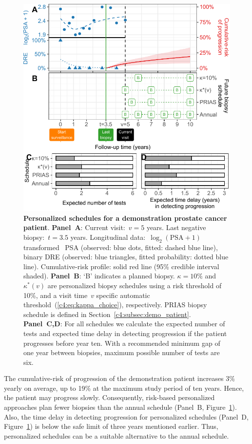 \begin{figure}
\centerline{\includegraphics{contents/c4/images/c4_fig5.pdf}}
\caption{\textbf{Personalized schedules for a demonstration prostate cancer patient}. \textbf{Panel~A}: Current visit:~$v=5$ years. Last negative biopsy:~$t=3.5$ years. Longitudinal data:~$\log_2(\mbox{PSA} + 1)$ transformed~\citep{tomer2019personalized} PSA (observed: blue dots, fitted: dashed blue line), binary DRE (observed: blue triangles, fitted probability: dotted blue line). Cumulative-risk profile: solid red line (95\% credible interval shaded). \textbf{Panel~B}: `B' indicates a planned biopsy. \textbf{$\kappa=10\%$} and \textbf{$\kappa^*(v)$} are personalized biopsy schedules using a risk threshold of 10\%, and a visit time~$v$ specific automatic threshold~(\ref{c4:eq:kappa_choice}), respectively. PRIAS biopsy schedule is defined in Section~\ref{c4:subsec:demo_patient}. \textbf{Panel~C,D}: For all schedules we calculate the expected number of tests and expected time delay in detecting progression if the patient progresses before year ten. With a recommended minimum gap of one year between biopsies, maximum possible number of tests are six.}
\label{c4:fig:5}
\end{figure}

The cumulative-risk of progression of the demonstration patient increases 3\% yearly on average, up to 19\% at the maximum study period of ten years. Hence, the patient may progress slowly. Consequently, risk-based personalized approaches plan fewer biopsies than the annual schedule (Panel~B, Figure~\ref{c4:fig:5}). Also, the time delay in detecting progression for personalized schedules (Panel~D, Figure~\ref{c4:fig:5}) is below the safe limit of three years mentioned earlier. Thus, personalized schedules can be a suitable alternative to the annual schedule.